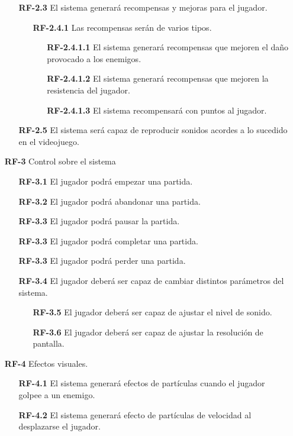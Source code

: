\begin{enumerate}
\begin{enumerate}
        \item[\textbf{RF-2.3}] El sistema generará recompensas y mejoras para el jugador. 
        \begin{enumerate}
            \item[\textbf{RF-2.4.1}] Las recompensas serán de varios tipos.
            \begin{enumerate}
                \item[\textbf{RF-2.4.1.1}] El sistema generará recompensas que mejoren el daño provocado a los enemigos.
                \item[\textbf{RF-2.4.1.2}] El sistema generará recompensas que mejoren la resistencia del jugador.
                \item[\textbf{RF-2.4.1.3}] El sistema recompensará con puntos al jugador.
            \end{enumerate}
        \end{enumerate}
        \item[\textbf{RF-2.5}] El sistema será capaz de reproducir sonidos acordes a lo sucedido en el videojuego.
    \end{enumerate}
    \item[\textbf{RF-3}] Control sobre el sistema
    \begin{enumerate}
        \item[\textbf{RF-3.1}] El jugador podrá empezar una partida.
        \item[\textbf{RF-3.2}] El jugador podrá abandonar una partida.
        \item[\textbf{RF-3.3}] El jugador podrá pausar la partida.
        \item[\textbf{RF-3.3}] El jugador podrá completar una partida.
        \item[\textbf{RF-3.3}] El jugador podrá perder una partida.
        \item[\textbf{RF-3.4}] El jugador deberá ser capaz de cambiar distintos parámetros del sistema.
        \begin{enumerate}
            \item[\textbf{RF-3.5}]  El jugador deberá ser capaz de ajustar el nivel de sonido.
            \item[\textbf{RF-3.6}]  El jugador deberá ser capaz de ajustar la resolución de pantalla.
        \end{enumerate} 
    \end{enumerate}
    \item[\textbf{RF-4}] Efectos visuales.
    \begin{enumerate}
        \item[\textbf{RF-4.1}] El sistema generará efectos de partículas cuando el jugador golpee a un enemigo.
        \item[\textbf{RF-4.2}] El sistema generará efecto de partículas de velocidad al desplazarse el jugador. 
    \end{enumerate}
\end{enumerate}

